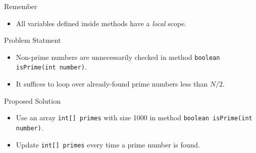 \documentclass[10pt, compress]{beamer}
\begin{document}
\begin{slide}
	\begin{block}{Remember}
		\begin{itemize}
			\item[] All variables defined inside methods have a \emph{local} scope.
		\end{itemize}
	\end{block}
\end{slide}

\begin{slide}
	\begin{block}{Problem Statment}
		\begin{itemize}
			\item[] Non-prime numbers are unnecessarily checked in method \texttt{boolean isPrime(int number)}.
			\item[] It suffices to loop over already-found prime numbers less than $N / 2$.
		\end{itemize}
	\end{block}
	\begin{block}{Proposed Solution}
		\begin{itemize}
			\item[] Use an array \texttt{int[] primes} with size 1000 in method \texttt{boolean isPrime(int number)}.
			\item[] Update \texttt{int[] primes} every time a prime number is found.
		\end{itemize}
	\end{block}
\end{slide}

\end{document}
